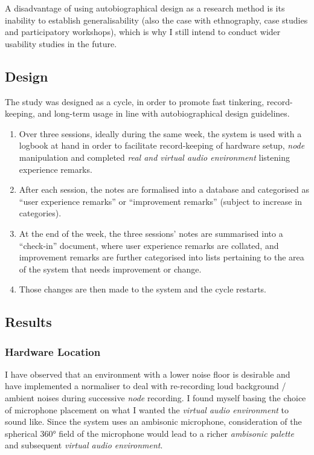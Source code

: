 A disadvantage of using autobiographical design as a research method is its inability to establish generalisability (also the case with ethnography, case studies and participatory workshops), which is why I still intend to conduct wider usability studies in the future.

\subsection{Design}
                                                \label{sec: area-study-design}
The study was designed as a cycle, in order to promote fast tinkering, record-keeping, and long-term usage in line with autobiographical design guidelines. 
\begin{enumerate}
    \item Over three sessions, ideally during the same week, the system is used with a logbook at hand in order to facilitate record-keeping of hardware setup, \textit{node} manipulation and completed \textit{real and virtual audio environment} listening experience remarks.
    \item After each session, the notes are formalised into a database and categorised as “user experience remarks” or “improvement remarks” (subject to increase in categories). 
    \item At the end of the week, the three sessions’ notes are summarised into a “check-in” document, where user experience remarks are collated, and improvement remarks are further categorised into lists pertaining to the area of the system that needs improvement or change.
    \item Those changes are then made to the system and the cycle restarts.
\end{enumerate}

\subsection{Results}                            \label{sec: area-study-results}
\subsubsection{Hardware Location}               \label{sec: area-study-results-hwloc}
I have observed that an environment with a lower noise floor is desirable and have implemented a normaliser to deal with re-recording loud background / ambient noises during successive \textit{node} recording. I found myself basing the choice of microphone placement on what I wanted the \textit{virtual audio environment} to sound like. Since the system uses an ambisonic microphone, consideration of the spherical 360° field of the microphone would lead to a richer \textit{ambisonic palette} and subsequent \textit{virtual audio environment}.


